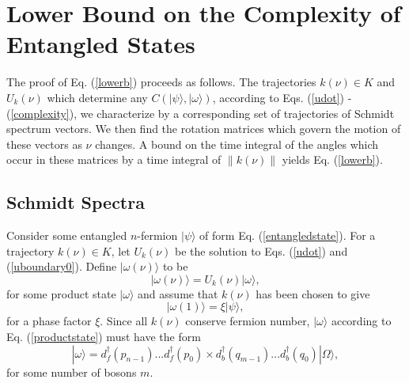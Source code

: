 \documentclass[12pt,amsmath,amssymb,onecolumn]{revtex4-2}
\begin{document}
\section{\label{app:lowerbound} Lower Bound on the Complexity of Entangled States}

The proof of Eq. (\ref{lowerb}) proceeds as follows. 
The trajectories $k(\nu) \in K$ and $U_k(\nu)$
which determine any $C( |\psi \rangle , |\omega \rangle )$, according to 
Eqs. (\ref{udot}) - (\ref{complexity}), we characterize 
by a corresponding
set of trajectories of Schmidt spectrum vectors. We then
find the rotation matrices which govern the motion of these vectors
as $\nu$ changes. A 
bound on the time integral of the angles which 
occur in these matrices by a time integral of $\parallel k(\nu) \parallel$ 
yields Eq. (\ref{lowerb}).

\subsection{\label{subsec:schmidtspectra} Schmidt Spectra}

Consider some entangled $n$-fermion $|\psi \rangle $ of form Eq. (\ref{entangledstate}).
For a trajectory $k(\nu) \in K$, let $U_k(\nu)$ be the solution to Eqs. (\ref{udot}) and (\ref{uboundary0}).
Define $|\omega(\nu) \rangle $ to be 
\begin{equation}
\label{omegaoft}
|\omega( \nu) \rangle  = U_k(\nu)|\omega \rangle ,
\end{equation}
for some product state $|\omega \rangle $
and assume that $k(\nu)$ has been chosen
to give
\begin{equation}
\label{upsiphi1}
|\omega(1) \rangle  = \xi |\psi \rangle , 
\end{equation}
for a phase factor $\xi$.
Since all $k(\nu)$ conserve fermion number, $|\omega \rangle $ according to
Eq. (\ref{productstate}) must have the form
\begin{equation}
\label{productstate1}
|\omega \rangle  = 
d_f^\dagger( p_{n-1}) ... d_f^\dagger( p_0) \times
d_b^\dagger( q_{m-1}) ... d_b^\dagger( q_0) |\Omega \rangle ,
\end{equation}
for some number of bosons $m$.
\end{document}
